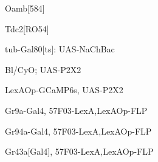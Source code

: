 \documentclass[17pt]{extarticle}
\begin{document}
\newpage{}
\vspace*{\fill}\begin{large}
Oamb[584] \\[0.5em]
\end{large}
\footnotesize
\vspace*{\fill}
\newpage{}
\vspace*{\fill}\begin{large}
Tdc2[RO54] \\[0.5em]
\end{large}
\footnotesize
\vspace*{\fill}
\newpage{}
\vspace*{\fill}\begin{footnotesize}
tub-Gal80[ts]: UAS-NaChBac \\[0.5em]
\end{footnotesize}
\footnotesize
\vspace*{\fill}
\newpage{}
\vspace*{\fill}\begin{small}
Bl/CyO; UAS-P2X2 \\[0.5em]
\end{small}
\footnotesize
\vspace*{\fill}
\newpage{}
\vspace*{\fill}\begin{footnotesize}
LexAOp-GCaMP6s, UAS-P2X2 \\[0.5em]
\end{footnotesize}
\footnotesize
\vspace*{\fill}
\newpage{}
\vspace*{\fill}\begin{scriptsize}
Gr9a-Gal4, 57F03-LexA,LexAOp-FLP \\[0.5em]
\end{scriptsize}
\footnotesize
\vspace*{\fill}
\newpage{}
\vspace*{\fill}\begin{scriptsize}
Gr94a-Gal4, 57F03-LexA,LexAOp-FLP \\[0.5em]
\end{scriptsize}
\footnotesize
\vspace*{\fill}
\newpage{}
\vspace*{\fill}\begin{scriptsize}
Gr43a[Gal4], 57F03-LexA,LexAOp-FLP \\[0.5em]
\end{scriptsize}
\footnotesize
\end{document}
